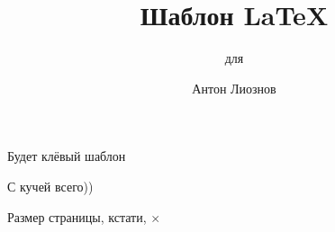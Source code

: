 \documentclass[14pt, aspectratio=43]{beamer}
\begin{document}
    \title{Шаблон \LaTeX}
    \subtitle{для \CSC}
    \author{Антон Лиознов}
    \institute{\CSC}
    \date{\the\year}
    \frame{\titlepage} 
    
    \begin{frame}{Будет клёвый шаблон}\relax
    
        С кучей {\ccsc всего}))
        
        Размер страницы, кстати, \the\paperwidth $\times$\the\paperheight
        
         
    \end{frame}
\end{document}
